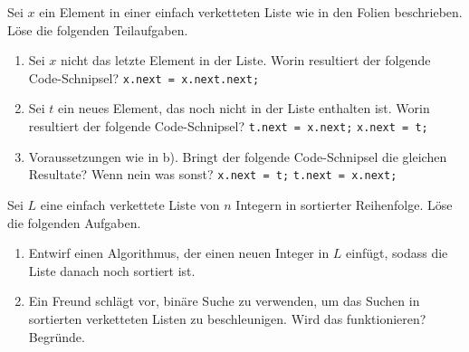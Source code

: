 \documentclass{uebung_cs}
\begin{document}
\begin{aufgabe}
	Sei $x$ ein Element in einer einfach verketteten Liste wie in den Folien beschrieben.
	Löse die folgenden Teilaufgaben.
	\begin{enumerate}
		\item Sei $x$ nicht das letzte Element in der Liste.
		Worin resultiert der folgende Code-Schnipsel?
		\hspace*{20pt}\texttt{x.next = x.next.next;}

		\item Sei $t$ ein neues Element, das noch nicht in der Liste enthalten ist.
		Worin resultiert der folgende Code-Schnipsel?
		\hspace*{20pt}\texttt{t.next = x.next;}
		\hspace*{20pt}\texttt{x.next = t;}

		\item Voraussetzungen wie in b).
		Bringt der folgende Code-Schnipsel die gleichen Resultate?
		Wenn nein was sonst?
		\hspace*{20pt}\texttt{x.next = t;}
		\hspace*{20pt}\texttt{t.next = x.next;}
	\end{enumerate}
\end{aufgabe}


\begin{aufgabe}
	Sei $L$ eine einfach verkettete Liste von $n$ Integern in sortierter Reihenfolge.
	Löse die folgenden Aufgaben.
	\begin{enumerate}
		\item Entwirf einen Algorithmus, der einen neuen Integer in $L$ einfügt, sodass die Liste danach noch sortiert ist.
		\item Ein Freund schlägt vor, binäre Suche zu verwenden, um das Suchen in sortierten verketteten Listen zu beschleunigen. Wird das funktionieren? Begründe.
	\end{enumerate}
\end{aufgabe}
\end{document}
